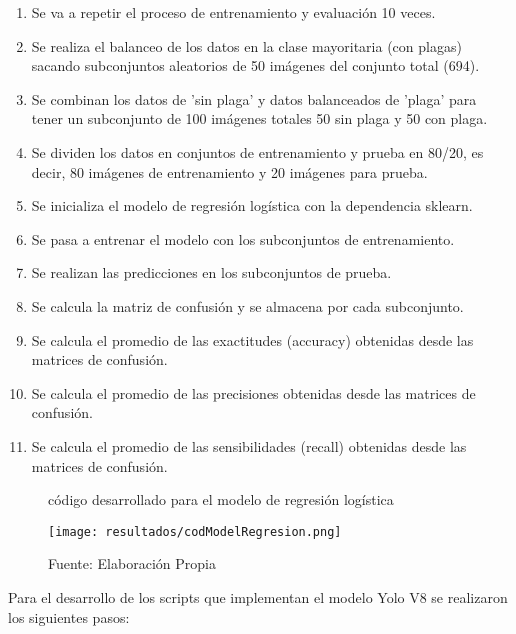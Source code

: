 \begin{enumerate}
    \item Se va a repetir el proceso de entrenamiento y evaluación 10 veces.
    \item Se realiza el balanceo de los datos en la clase mayoritaria (con plagas) sacando subconjuntos aleatorios de 50 imágenes del conjunto total (694).
    \item Se combinan los datos de 'sin plaga' y datos balanceados de 'plaga’ para tener un subconjunto de 100 imágenes totales 50 sin plaga y 50 con plaga.
    \item Se dividen los datos en conjuntos de entrenamiento y prueba en 80/20, es decir, 80 imágenes de entrenamiento y 20 imágenes para prueba.
    \item Se inicializa el modelo de regresión logística con la dependencia sklearn.
    \item Se pasa a entrenar el modelo con los subconjuntos de entrenamiento.
    \item Se realizan las predicciones en los subconjuntos de prueba.
    \item Se calcula la matriz de confusión y se almacena por cada subconjunto.
    \item Se calcula el promedio de las exactitudes (accuracy) obtenidas desde las matrices de confusión.
    \item Se calcula el promedio de las precisiones obtenidas desde las matrices de confusión.
    \item Se calcula el promedio de las sensibilidades (recall) obtenidas desde las matrices de confusión.
\end{enumerate}

\newpage

\begin{figure}[h]
\centering
\caption{código desarrollado para el modelo de regresión logística}
\texttt{[image: resultados/codModelRegresion.png]}
\caption*{\footnotesize Fuente: Elaboración Propia}
\label{fig:figuraCodModelRegresion}
\end{figure}

Para el desarrollo de los scripts que implementan el modelo Yolo V8 se realizaron los siguientes pasos:

